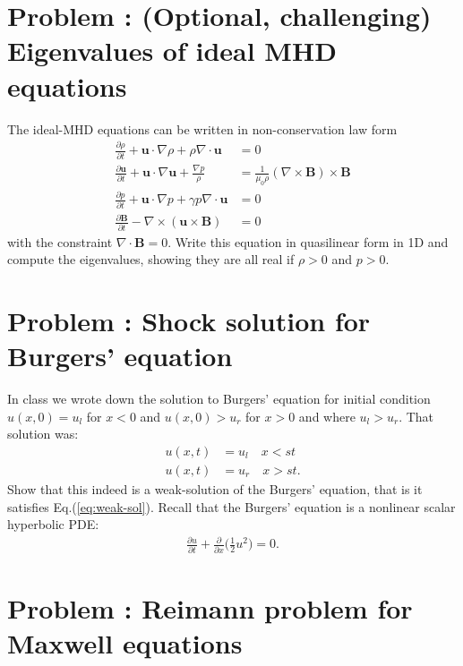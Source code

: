 \documentclass[11pt]{article}
\newcommand{\eqr}[1]{Eq.\thinspace(#1)}
\newcommand{\pfrac}[2]{\frac{\partial #1}{\partial #2}}
\newcommand{\mvec}[1]{\mathbf{#1}}
\newcounter{probnum}
\begin{document}
\section*{Problem : (Optional, challenging) Eigenvalues of ideal MHD equations}

The ideal-MHD equations can be written in non-conservation law form
\begin{align*}
  \frac{\partial \rho}{\partial t}+ \mvec{u}\cdot\nabla\rho + \rho\nabla\cdot\mathbf{u}&=0 \\
  \frac{\partial \mathbf{u}}{\partial t}+\mathbf{u} \cdot \nabla
  \mathbf{u}
  +\frac{\nabla p}{\rho} &=
                           {\frac{1}{\mu_{0}\rho}(\nabla \times \mathbf{B}) \times \mathbf{B}} \\
    \frac{\partial p}{\partial t}+\mathbf{u} \cdot \nabla p+\gamma p
  \nabla \cdot \mathbf{u} &= 0 \\
  {\frac{\partial \mathbf{B}}{\partial t}-\nabla \times(\mathbf{u} \times \mathbf{B})} &= {0}
\end{align*}
with the constraint $\nabla\cdot\mvec{B} = 0$. Write this equation in
quasilinear form in 1D and compute the eigenvalues, showing they are
all real if $\rho>0$ and $p>0$.

\section*{Problem : Shock solution for Burgers'
  equation}

In class we wrote down the solution to Burgers' equation for initial
condition $u(x,0) = u_l$ for $x<0$ and $u(x,0) > u_r$ for $x>0$ and
where $u_l > u_r$. That solution was:
\begin{align*}
  u(x,t) &= u_l \quad x < st \\
  u(x,t) &= u_r \quad x > st.
\end{align*}
Show that this indeed is a weak-solution of the Burgers' equation,
that is it satisfies \eqr{\ref{eq:weak-sol}}. Recall that the Burgers'
equation is a nonlinear scalar hyperbolic PDE:
\begin{align*}
    \pfrac{u}{t} + \frac{\partial}{\partial x}\bigg( \frac{1}{2} u^2
    \bigg) = 0.  
\end{align*}

\section*{Problem : Reimann problem for Maxwell
  equations}
\end{document}
